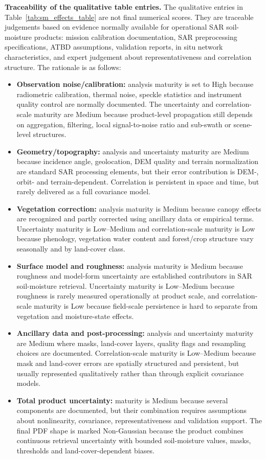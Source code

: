 \noindent\textbf{Traceability of the qualitative table entries.}
The qualitative entries in Table~\ref{tab:sm_effects_table} are not final numerical scores. They are traceable judgements based on evidence normally available for operational SAR soil-moisture products: mission calibration documentation, SAR preprocessing specifications, ATBD assumptions, validation reports, in situ network characteristics, and expert judgement about representativeness and correlation structure. The rationale is as follows:
\begin{itemize}
  \item \textbf{Observation noise/calibration:} analysis maturity is set to High because radiometric calibration, thermal noise, speckle statistics and instrument quality control are normally documented. The uncertainty and correlation-scale maturity are Medium because product-level propagation still depends on aggregation, filtering, local signal-to-noise ratio and sub-swath or scene-level structures.
  \item \textbf{Geometry/topography:} analysis and uncertainty maturity are Medium because incidence angle, geolocation, DEM quality and terrain normalization are standard SAR processing elements, but their error contribution is DEM-, orbit- and terrain-dependent. Correlation is persistent in space and time, but rarely delivered as a full covariance model.
  \item \textbf{Vegetation correction:} analysis maturity is Medium because canopy effects are recognized and partly corrected using ancillary data or empirical terms. Uncertainty maturity is Low--Medium and correlation-scale maturity is Low because phenology, vegetation water content and forest/crop structure vary seasonally and by land-cover class.
  \item \textbf{Surface model and roughness:} analysis maturity is Medium because roughness and model-form uncertainty are established contributors in SAR soil-moisture retrieval. Uncertainty maturity is Low--Medium because roughness is rarely measured operationally at product scale, and correlation-scale maturity is Low because field-scale persistence is hard to separate from vegetation and moisture-state effects.
  \item \textbf{Ancillary data and post-processing:} analysis and uncertainty maturity are Medium where masks, land-cover layers, quality flags and resampling choices are documented. Correlation-scale maturity is Low--Medium because mask and land-cover errors are spatially structured and persistent, but usually represented qualitatively rather than through explicit covariance models.
  \item \textbf{Total product uncertainty:} maturity is Medium because several components are documented, but their combination requires assumptions about nonlinearity, covariance, representativeness and validation support. The final PDF shape is marked Non-Gaussian because the product combines continuous retrieval uncertainty with bounded soil-moisture values, masks, thresholds and land-cover-dependent biases.
\end{itemize}
